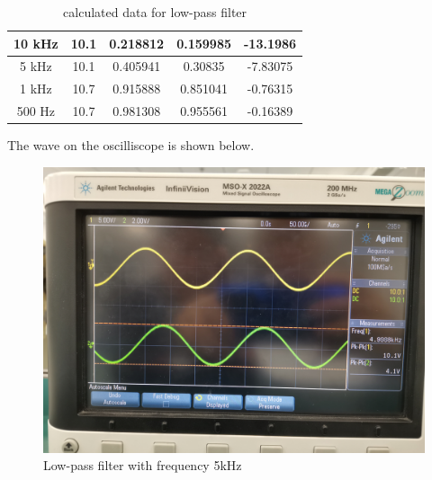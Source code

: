 \documentclass{article}
\begin{document}
\begin{table}[H]
\begin{tabular}{|c|c|c|c|c|}
10 kHz    & 10.1                                                                      & 0.218812                                                                              & 0.159985                                                                             & -13.1986                                                                                        \\ \hline
5 kHz     & 10.1                                                                      & 0.405941                                                                              & 0.30835                                                                              & -7.83075                                                                                        \\ \hline
1 kHz     & 10.7                                                                      & 0.915888                                                                              & 0.851041                                                                             & -0.76315                                                                                        \\ \hline
500 Hz    & 10.7                                                                      & 0.981308                                                                              & 0.955561                                                                             & -0.16389                                                                                        \\ \hline
\end{tabular}
\caption{calculated data for low-pass filter}
\end{table}

The wave on the oscilliscope is shown below.
  \begin{figure}[H]
  \centering
  \includegraphics[width=.6\textwidth]{Figure7.jpg}
  \caption{Low-pass filter with frequency 5kHz}
  \label{img} 
\end{figure}
\end{document}
